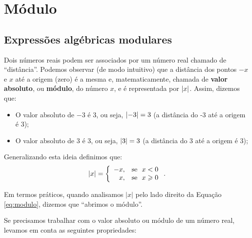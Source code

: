  \chapter{Módulo}

 \section{Expressões algébricas modulares}

 Dois números reais podem ser associados por um número real chamado de ``distância''. Podemos observar (de modo intuitivo) que a distância dos pontos $-x$ e $x$ até a origem (zero) é a mesma e, matematicamente, chamada de \textbf{valor absoluto}, ou \textbf{módulo}, do número $x$, e é representada por $\left|x\right|$. Assim, dizemos que:
\begin{itemize}
\item O valor absoluto de $-3$ é $3$, ou seja, $\left|-3\right|= 3$ (a distância do -3 até a origem é 3);
\item O valor absoluto de $3$ é $3$, ou seja, $\left|3\right|= 3$ (a distância do 3 até a origem é 3);
\end{itemize}
\begin{obs}
Generalizando esta ideia definimos que:
\begin{equation}
\label{eq:modulo}
\left|x\right|= \left\{\begin{array}{rl}
      -x , & \text{se} \ \ x<0 \\
      x , & \text{se} \ \ x \geqslant 0
     \end{array}\right. .
     \end{equation}
\end{obs}

Em termos práticos, quando analisamos $|x|$ pelo lado direito da Equação \ref{eq:modulo}, dizemos que ``abrimos o módulo''.

Se precisamos trabalhar com o valor absoluto ou módulo de um número real, levamos em conta as seguintes propriedades:

